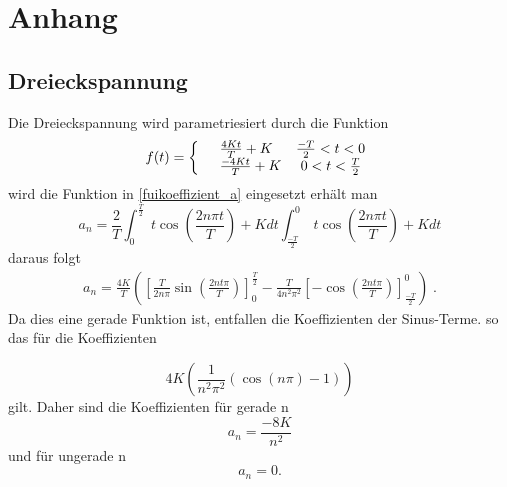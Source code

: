 \section{Anhang}
\label{sec:Anhang}
\subsection{Dreieckspannung}
\label{sec:Dreieckspannung}
Die Dreieckspannung wird parametriesiert durch die Funktion
\begin{equation*}
  f(t)=\left\{
  \begin{array}{l l}
    &\frac{4Kt}{T}+K   \;\;\;\;\;\;\frac{-T}{2}<t<0 \\
    &\frac{-4Kt}{T}+K  \;\;\;\;\;0<t<\frac{T}{2}
  \end{array}
  \right.
\end{equation*}
wird die Funktion in \eqref{fuikoeffizient_a} eingesetzt erhält man
\begin{equation*}
  a_n=\frac{2}{T}\int^{\frac{T}{2}}_0 \;t \cos\left(\frac{2n \pi t}{T} \right) + K dt
  \int^0_{\frac{-T}{2}} \; t \cos\left(\frac{2n\pi t}{T} \right) + K dt
\end{equation*}
daraus folgt
\begin{align*}
  a_n=\frac{4K}{T}\left(\left[ \frac{T}{2n\pi}\sin(\frac{2nt\pi}{T})\right]
  ^\frac{T}{2}_0-\frac{T}{4n^2\pi^2}\left[-\cos\left(\frac{2nt\pi}{T}\right)
  \right]^0_\frac{-T}{2} \right)\;.
\end{align*}
Da dies eine gerade Funktion ist, entfallen die Koeffizienten der Sinus-Terme.
so das für die Koeffizienten

\begin{equation}
  4K\left(\frac{1}{n^2\pi^2}(\cos(n\pi)-1)\right)
\end{equation}
gilt. Daher sind die Koeffizienten für gerade n
\begin{equation*}
a_n=\frac{-8K}{n^2}
\end{equation*}
und für ungerade n
\begin{equation*}
  a_n=0.
\end{equation*}
